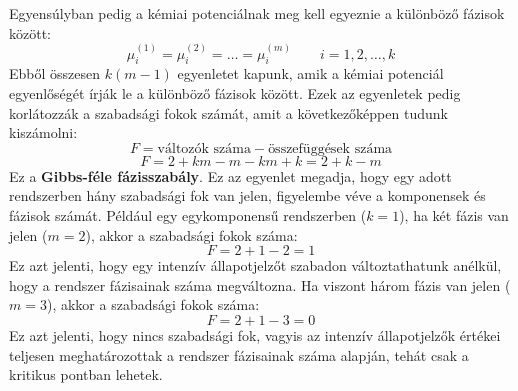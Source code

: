 \documentclass[../main.tex]{subfiles}
\begin{document}
Egyensúlyban pedig a kémiai potenciálnak meg kell egyeznie a különböző fázisok között:
\begin{equation}
    \mu_i^{(1)} = \mu_i^{(2)} = \ldots = \mu_i^{(m)} \qquad i = 1, 2, \ldots, k
\end{equation}
Ebből összesen $k(m - 1)$ egyenletet kapunk, amik a kémiai potenciál egyenlőségét írják le a különböző fázisok között.
Ezek az egyenletek pedig korlátozzák a szabadsági fokok számát, amit a következőképpen tudunk kiszámolni:
\begin{equation}
    F = \text{változók száma} - \text{összefüggések száma}
\end{equation}
\begin{equation}
    F = 2 + km - m - km + k = 2 + k - m
\end{equation}
Ez a \textbf{Gibbs-féle fázisszabály}. Ez az egyenlet megadja, hogy egy adott rendszerben hány szabadsági fok van jelen, figyelembe véve a komponensek és fázisok számát.
Például egy egykomponensű rendszerben ($k=1$), ha két fázis van jelen ($m=2$), akkor a szabadsági fokok száma:
\begin{equation}
    F = 2 + 1 - 2 = 1
\end{equation}
Ez azt jelenti, hogy egy intenzív állapotjelzőt szabadon változtathatunk anélkül, hogy a rendszer fázisainak száma megváltozna. Ha viszont három fázis van jelen ($m=3$), akkor a szabadsági fokok száma:
\begin{equation}
    F = 2 + 1 - 3 = 0
\end{equation}
Ez azt jelenti, hogy nincs szabadsági fok, vagyis az intenzív állapotjelzők értékei teljesen meghatározottak a rendszer fázisainak száma alapján, tehát csak a kritikus pontban lehetek.
\end{document}
